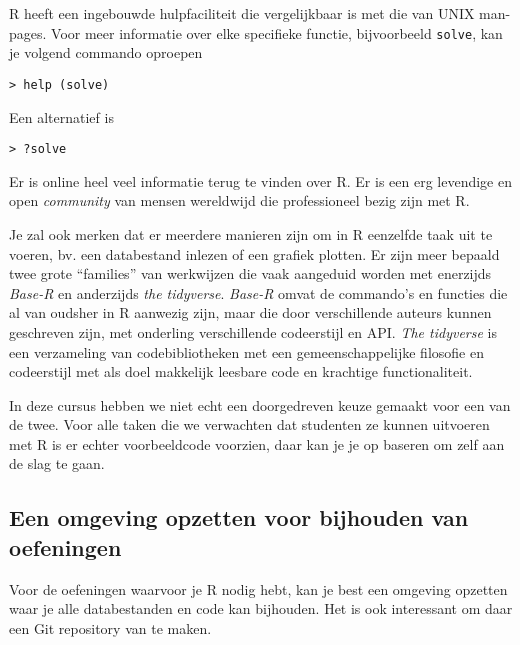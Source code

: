 R heeft een ingebouwde hulpfaciliteit die vergelijkbaar is met die van UNIX man-pages. Voor meer informatie over elke specifieke functie, bijvoorbeeld \texttt{solve}, kan je volgend commando oproepen

\begin{lstlisting}
> help (solve)
\end{lstlisting}

Een alternatief is
\begin{lstlisting}
> ?solve
\end{lstlisting}

Er is online heel veel informatie terug te vinden over R. Er is een erg levendige en open \textit{community} van mensen wereldwijd die professioneel bezig zijn met R.

Je zal ook merken dat er meerdere manieren zijn om in R eenzelfde taak uit te voeren, bv. een databestand inlezen of een grafiek plotten. Er zijn meer bepaald twee grote ``families'' van werkwijzen die vaak aangeduid worden met enerzijds \textit{Base-R} en anderzijds \textit{the tidyverse}. \textit{Base-R} omvat de commando's en functies die al van oudsher in R aanwezig zijn, maar die door verschillende auteurs kunnen geschreven zijn, met onderling verschillende codeerstijl en API. \textit{The tidyverse} is een verzameling van codebibliotheken met een gemeenschappelijke filosofie en codeerstijl met als doel makkelijk leesbare code en krachtige functionaliteit.

In deze cursus hebben we niet echt een doorgedreven keuze gemaakt voor een van de twee. Voor alle taken die we verwachten dat studenten ze kunnen uitvoeren met R is er echter voorbeeldcode voorzien, daar kan je je op baseren om zelf aan de slag te gaan.

\subsection{Een omgeving opzetten voor bijhouden van oefeningen}

Voor de oefeningen waarvoor je R nodig hebt, kan je best een omgeving opzetten waar je alle databestanden en code kan bijhouden. Het is ook interessant om daar een Git repository van te maken.

